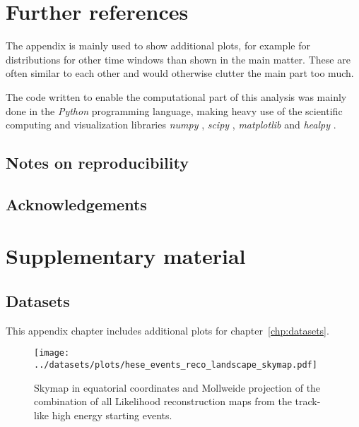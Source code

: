 \chapter{Further references}
The appendix is mainly used to show additional plots, for example for distributions for other time windows than shown in the main matter.
These are often similar to each other and would otherwise clutter the main part too much.

The code written to enable the computational part of this analysis was mainly done in the \emph{Python} programming language, making heavy use of the scientific computing and visualization libraries \emph{numpy} \cite{numpy}, \emph{scipy} \cite{scipy}, \emph{matplotlib} \cite{matplotlib} and \emph{healpy} \cite{Gorski:2004by}.

\section{Notes on reproducibility}

\section{Acknowledgements}


\chapter{Supplementary material}
\section{Datasets}
This appendix chapter includes additional plots for chapter~\ref{chp:datasets}.

\begin{figure}[htbp]
  \centering
  \texttt{[image: ../datasets/plots/hese\_events\_reco\_landscape\_skymap.pdf]}
  \caption[Combined Likelihood skymap of the 22 HESEs]{
    Skymap in equatorial coordinates and Mollweide projection of the combination of all Likelihood reconstruction maps from the track-like high energy starting events.
  }
  \label{fig:hese_events_reco_landscape_skymap}
\end{figure}

